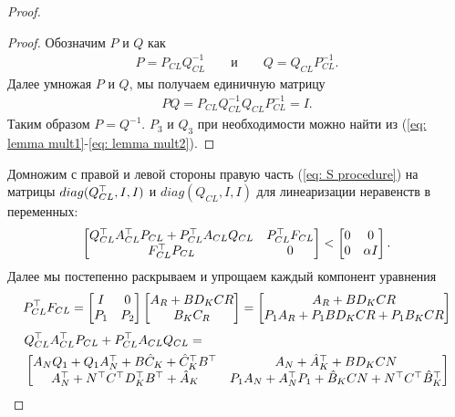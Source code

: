 \begin{proof}
\begin{proof}
	Обозначим ${P}$ и ${Q}$ как 
	\begin{align*}
		{P} = {P}_{CL}{Q}_{CL}^{-1} \qquad и \qquad {Q} ={Q}_{CL}{P}_{CL}^{-1}.
	\end{align*} 
	Далее умножая ${P}$ и ${Q}$, мы получаем единичную матрицу
	\begin{align*}
		{P}{Q}={P}_{CL}{Q}_{CL}^{-1}{Q}_{CL}{P}_{CL}^{-1}={I}.
	\end{align*}
	Таким образом ${P}={Q}^{-1}$.
	${P}_3$ и ${Q}_3$ при необходимости можно найти из (\ref{eq: lemma mult1}-\ref{eq: lemma mult2}).
\end{proof}
Домножим с правой и левой стороны правую часть (\ref{eq: S procedure}) на матрицы $diag({Q}_{CL}^\top, {I}, {I})$ и $diag({Q}_{CL}, {I}, {I})$ для линеаризации неравенств в переменных:
\begin{align}
	\begin{bmatrix}
		{Q}_{CL}^\top{A}_{CL}^\top {P}_{CL} + {P}_{CL}^\top{A}_{CL}{Q}_{CL} & {P}_{CL}^\top{F}_{CL} \\
		{F}_{CL}^\top{P}_{CL} & 0
	\end{bmatrix} < 
	\begin{bmatrix}
		0 & 0\\
		0 & \alpha {I}
	\end{bmatrix}.
\end{align}
Далее мы постепенно раскрываем и упрощаем каждый компонент уравнения
\begin{align}
	{P}_{CL}^\top{F}_{CL} = \begin{bmatrix}
		{I} & 0 \\
		{P}_{1} & {P}_{2}
	\end{bmatrix}
	\begin{bmatrix}
		{A}_R + {B}{D}_K{C}{R}\\ {B}_K{C}_R
	\end{bmatrix} =
	\begin{bmatrix}
		{A}_R + {B}{D}_K{C}{R}\\
		{P}_{1}{A}_R + {P}_{1}{B}{D}_K{C}{R}+{P}_1{B}_K{C}{R}
	\end{bmatrix}
\end{align}
%
\begin{align}
	&{Q}_{CL}^\top{A}_{CL}^\top {P}_{CL} + {P}_{CL}^\top{A}_{CL}{Q}_{CL} = \nonumber \\
	& \begin{bmatrix}
		{A}_N{Q}_{1} +{Q}_{1}{A}_N^\top + {B}{\hat{C}}_K +{\hat{C}}_K^\top{B}^\top & {A}_N + {\hat{A}}_K^\top +{B}{D}_K{C}{N}\\
		{A}_N^\top + {N}^\top{C}^\top{D}_K^\top{B}^\top+{\hat{A}}_K & {P}_{1}{A}_N +{A}_N^\top{P}_{1}+{\hat{B}}_K{C}{N}+{N}^\top{C}^\top{\hat{B}}_K^\top

\end{bmatrix}
\end{align}
\end{proof}
